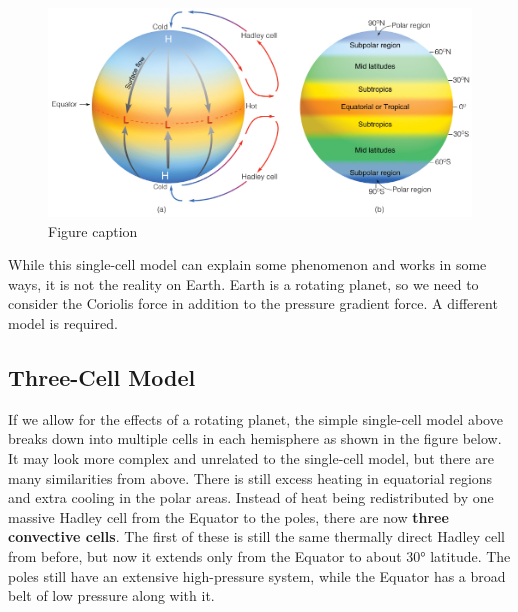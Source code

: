 \documentclass[12pt,oneside]{book}
\begin{document}
\begin{figure}

{\centering \includegraphics[width=0.8\linewidth]{figures/Figure511} 

}

\caption{Figure caption}\label{fig:Fig511}
\end{figure}

While this single-cell model can explain some phenomenon and works in
some ways, it is not the reality on Earth. Earth is a rotating planet,
so we need to consider the Coriolis force in addition to the pressure
gradient force. A different model is required.

\subsection{Three-Cell Model}\label{three-cell-model}

If we allow for the effects of a rotating planet, the simple single-cell
model above breaks down into multiple cells in each hemisphere as shown
in the figure below. It may look more complex and unrelated to the
single-cell model, but there are many similarities from above. There is
still excess heating in equatorial regions and extra cooling in the
polar areas. Instead of heat being redistributed by one massive Hadley
cell from the Equator to the poles, there are now \textbf{three
convective cells}. The first of these is still the same thermally direct
Hadley cell from before, but now it extends only from the Equator to
about 30° latitude. The poles still have an extensive high-pressure
system, while the Equator has a broad belt of low pressure along with
it.
\end{document}

